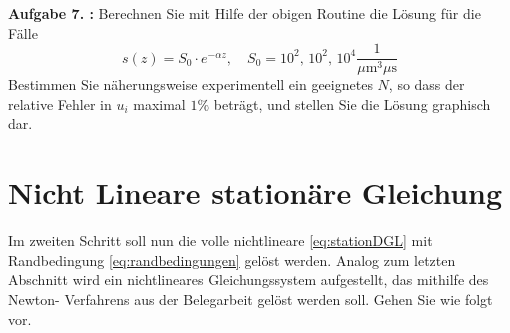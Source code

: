 %
%
%
%
\begin{mybox}
	\textbf{Aufgabe 7. :}	Berechnen Sie mit Hilfe der obigen Routine die Lösung
	für die Fälle
	\begin{equation}
		s(z)=S_0\cdot e^{-\alpha z}, \quad S_0=10^2, \, 10^2, \, 10^4
		\frac{1}{\si{\mu\meter^3 \mu \s}}
	\end{equation}
	Bestimmen Sie näherungsweise experimentell ein geeignetes $N$, so dass der
	relative Fehler in $u_i$
	maximal $1\%$ beträgt, und stellen Sie die Lösung graphisch dar.
\end{mybox}
\begin{figure}

	
\end{figure}

\section{Nicht Lineare stationäre Gleichung}
\begin{mybox}
	Im zweiten Schritt soll nun die volle nichtlineare \cref{eq:stationDGL}
	mit Randbedingung \cref{eq:randbedingungen} gelöst werden. Analog
	zum letzten Abschnitt wird ein nichtlineares Gleichungssystem
	aufgestellt, das mithilfe des Newton-
	Verfahrens aus der Belegarbeit gelöst werden soll. Gehen Sie wie folgt
	vor.\cite{Prof.Dr.AndreasZeiser.April2021}
\end{mybox}


